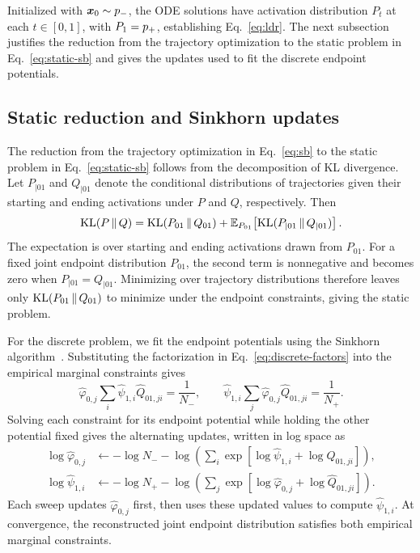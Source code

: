 Initialized with $\boldsymbol{x}_0\sim p_{-}$, the ODE solutions have activation distribution $P_t$ at each $t\in[0,1]$, with $P_1=p_{+}$, establishing Eq.~\eqref{eq:ldr}. The next subsection justifies the reduction from the trajectory optimization to the static problem in Eq.~\eqref{eq:static-sb} and gives the updates used to fit the discrete endpoint potentials.

\subsection{Static reduction and Sinkhorn updates}
The reduction from the trajectory optimization in Eq.~\eqref{eq:sb} to the static problem in Eq.~\eqref{eq:static-sb} follows from the decomposition of KL divergence. Let $P_{\mid01}$ and $Q_{\mid01}$ denote the conditional distributions of trajectories given their starting and ending activations under $P$ and $Q$, respectively. Then~\citep{leonard2013survey}
\begin{equation}
\mathrm{KL}(P\,\Vert\,Q)
=\mathrm{KL}(P_{01}\,\Vert\,Q_{01})
+\mathbb{E}_{P_{01}}\!\left[\mathrm{KL}(P_{\mid01}\,\Vert\,Q_{\mid01})\right].
\label{eq:apx-disint}
\end{equation}
The expectation is over starting and ending activations drawn from $P_{01}$. For a fixed joint endpoint distribution $P_{01}$, the second term is nonnegative and becomes zero when $P_{\mid01}=Q_{\mid01}$. Minimizing over trajectory distributions therefore leaves only $\mathrm{KL}(P_{01}\,\Vert\,Q_{01})$ to minimize under the endpoint constraints, giving the static problem.

For the discrete problem, we fit the endpoint potentials using the Sinkhorn algorithm~\citep{cuturi2013sinkhorn}. Substituting the factorization in Eq.~\eqref{eq:discrete-factors} into the empirical marginal constraints gives
\[
\widehat{\varphi}_{0,j}\sum_i\widehat{\psi}_{1,i}\widehat{Q}_{01,ji}=\frac{1}{N_-},
\qquad
\widehat{\psi}_{1,i}\sum_j\widehat{\varphi}_{0,j}\widehat{Q}_{01,ji}=\frac{1}{N_+}.
\]
Solving each constraint for its endpoint potential while holding the other potential fixed gives the alternating updates, written in log space as
\begin{align}
\log\widehat{\varphi}_{0,j}
&\leftarrow-\log N_- -\log\!\left(\sum_i\exp\!\left[\log\widehat{\psi}_{1,i}+\log\widehat{Q}_{01,ji}\right]\right),\nonumber\\
\log\widehat{\psi}_{1,i}
&\leftarrow-\log N_+ -\log\!\left(\sum_j\exp\!\left[\log\widehat{\varphi}_{0,j}+\log\widehat{Q}_{01,ji}\right]\right).
\label{eq:sinkhorn}
\end{align}
Each sweep updates $\widehat{\varphi}_{0,j}$ first, then uses these updated values to compute $\widehat{\psi}_{1,i}$. At convergence, the reconstructed joint endpoint distribution satisfies both empirical marginal constraints.

